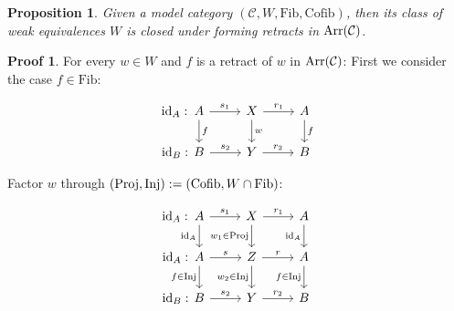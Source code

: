 \documentclass[a4paper]{article}
\theoremstyle{plain}
\newtheorem{prop}[thm]{Proposition}
\theoremstyle{definition}
\newtheorem*{prf}{Proof}
\theoremstyle{remark}
\newcommand{\mc}[1]{\mathcal{#1}}
\newcommand{\mcC}{\mc C}
\newcommand{\id}{\mathrm{id}}
\DeclareMathOperator{\Proj}{\rm{Proj}}
\DeclareMathOperator{\Inj}{\rm{Inj}}
\DeclareMathOperator{\Arr}{\rm{Arr}}
\newcommand{\Cofib}{\mathrm{Cofib}}
\newcommand{\Fib}{\mathrm{Fib}}
\begin{document}
        \begin{prop}
            Given a model category $(\mcC, W, \Fib, \Cofib)$, then its
            class of weak equivalences $W$ is closed under forming retracts in $\Arr(\mcC)$.
        \end{prop}
        \begin{prf}
            \par For every $w \in W$ and $f$ is a retract of $w$ in $\Arr(\mcC)$:
            First we consider the case $f \in \Fib$:

            \[\begin{tikzcd}
                A & X & A \\
                B & Y & B
                \arrow["{w}", from=1-2, to=2-2]
                \arrow["r_1", from=1-2, to=1-3]
                \arrow["r_2", from=2-2, to=2-3]
                \arrow["\id_A : \hspace*{2.77cm}"{marking}, "s_1", from=1-1, to=1-2]
                \arrow["\id_B : \hspace*{2.77cm}"{marking}, "s_2",from=2-1, to=2-2]
                \arrow["f", from=1-1, to=2-1]
                \arrow["f", from=1-3, to=2-3]
            \end{tikzcd}\]

            \par Factor $w$ through $(\Proj, \Inj) := (\Cofib, W \cap \Fib)$:

            \[\begin{tikzcd}
                A & X & A \\
                A & Z & A \\
                B & Y & B
                \arrow["\id_B : \hspace*{2.77cm}"{marking}, "{s_2}", from=3-1, to=3-2]
                \arrow["{r_2}", from=3-2, to=3-3]
                \arrow["f \in \Inj"', from=2-3, to=3-3]
                \arrow["{w_2 \in \Inj}"', from=2-2, to=3-2]
                \arrow["{w_1 \in \Proj}"', from=1-2, to=2-2]
                \arrow["\id_A"', from=1-3, to=2-3]
                \arrow["\id_A"', from=1-1, to=2-1]
                \arrow["f \in \Inj"', from=2-1, to=3-1]
                \arrow["\id_A : \hspace*{2.77cm}"{marking}, "{s_1}", from=1-1, to=1-2]
                \arrow["{r_1}", from=1-2, to=1-3]
                \arrow["\id_A : \hspace*{2.77cm}"{marking}, "s", from=2-1, to=2-2]
                \arrow["r", from=2-2, to=2-3]
            \end{tikzcd}\]
            


\end{prf}
\end{document}
